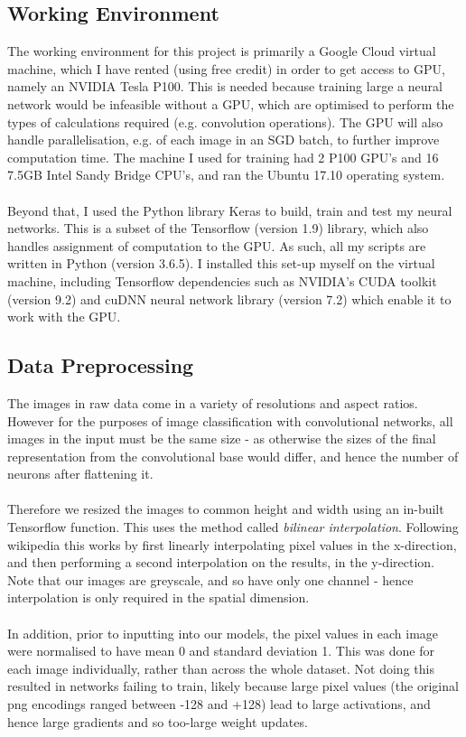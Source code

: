 \documentclass[11pt]{article} %
\theoremstyle{plain}
\theoremstyle{definition}
\begin{document}
\subsection{Working Environment}
The working environment for this project is primarily a Google Cloud virtual machine, which I have rented (using free credit) in order to get access to GPU, namely an NVIDIA Tesla P100. This is needed because training large a neural network would be infeasible without a GPU, which are optimised to perform the types of calculations required (e.g. convolution operations). The GPU will also handle parallelisation, e.g. of each image in an SGD batch, to further improve computation time. The machine I used for training had 2 P100 GPU's and 16 7.5GB Intel Sandy Bridge CPU's, and ran the Ubuntu 17.10 operating system.
\\
\\
\noindent
Beyond that, I used the Python library Keras to build, train and test my neural networks. This is a subset of the Tensorflow (version 1.9) library, which also handles assignment of computation to the GPU. As such, all my scripts are written in Python (version 3.6.5). I installed this set-up myself on the virtual machine, including Tensorflow dependencies such as NVIDIA's CUDA toolkit (version 9.2) and cuDNN neural network library (version 7.2) which enable it to work with the GPU.

\subsection{Data Preprocessing}
The images in raw data come in a variety of resolutions and aspect ratios. However for the purposes of image classification with convolutional networks, all images in the input must be the same size - as otherwise the sizes of the final representation from the convolutional base would differ, and hence the number of neurons after flattening it. 
\\
\\
\noindent
Therefore we resized the images to common height and width using an in-built Tensorflow function. This uses the method called \textit{bilinear interpolation}. Following wikipedia \cite{wiki:bilinear_interpolation} this works by first linearly interpolating pixel values in the x-direction, and then performing a second interpolation on the results, in the y-direction. Note that our images are greyscale, and so have only one channel - hence interpolation is only required in the spatial dimension.
\\
\\
\noindent
In addition, prior to inputting into our models, the pixel values in each image were normalised to have mean 0 and standard deviation 1. This was done for each image individually, rather than across the whole dataset. Not doing this resulted in networks failing to train, likely because large pixel values (the original png encodings ranged between -128 and +128) lead to large activations, and hence large gradients and so too-large weight updates.
\end{document}
